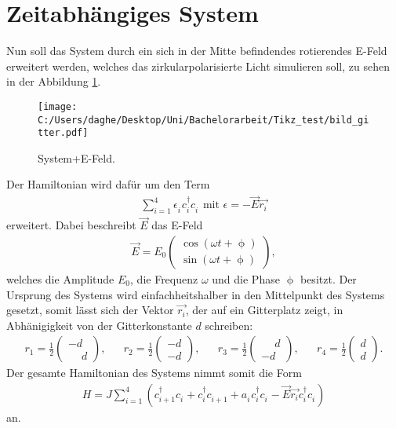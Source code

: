 \section{Zeitabhängiges System}
Nun soll das System durch ein sich in der Mitte befindendes rotierendes E-Feld erweitert werden, welches
das zirkularpolarisierte Licht simulieren soll, zu sehen in der Abbildung \ref{fig:syst+E}.

\begin{figure}
   \centering
   \texttt{[image: C:/Users/daghe/Desktop/Uni/Bachelorarbeit/Tikz\_test/bild\_gitter.pdf]}
   \caption{System+E-Feld.}
   \label{fig:syst+E}
\end{figure}


Der Hamiltonian wird dafür um den Term
\begin{align}
  \sum_{i=1}^4 \epsilon_i^{\phantom{\dag}} c_i^\dag c_i^{\phantom{\dag}}  \,\,   \text{mit} \,\, \epsilon=-\vec{E} \vec{r_i}
\end{align}
erweitert. Dabei beschreibt $\vec E$ das E-Feld
\begin{align}
  \vec E=E_0\begin{pmatrix}
\cos\left(\omega t+\upphi\right)\\
\sin\left(\omega t+\upphi\right)
 \end{pmatrix},
\end{align}
welches die Amplitude $E_0$, die Frequenz $\omega$ und die Phase $\upphi$ besitzt.
Der Ursprung des Systems wird einfachheitshalber in den Mittelpunkt des Systems gesetzt,
somit lässt sich der Vektor $\vec{r_i}$, der auf ein Gitterplatz zeigt, in Abhänigigkeit von der Gitterkonstante $d$ schreiben:
\begin{align}
  r_1=\frac{1}{2}\begin{pmatrix}-d  \\ \phantom{-}d \end{pmatrix},& &
  r_2=\frac{1}{2}\begin{pmatrix}-d  \\ -d \end{pmatrix},& &
  r_3=\frac{1}{2}\begin{pmatrix}\phantom{-}d  \\ -d \end{pmatrix},& &
  r_4=\frac{1}{2}\begin{pmatrix}d  \\ d \end{pmatrix}.
\end{align}
Der gesamte Hamiltonian des Systems nimmt somit die Form
\begin{align}
H=J\sum_{i=1}^4 \left(c_{i+1}^\dag c_i^{\phantom{\dag}} + c_{i}^\dag c_{i+1}^{\phantom{\dag}}   +a_i^{\phantom{\dag}} c_i^\dag c_i^{\phantom{\dag}} -\vec{E} \vec{r_i}  c_i^\dag c_i^{\phantom{\dag}}\right)
\end{align}
an.


